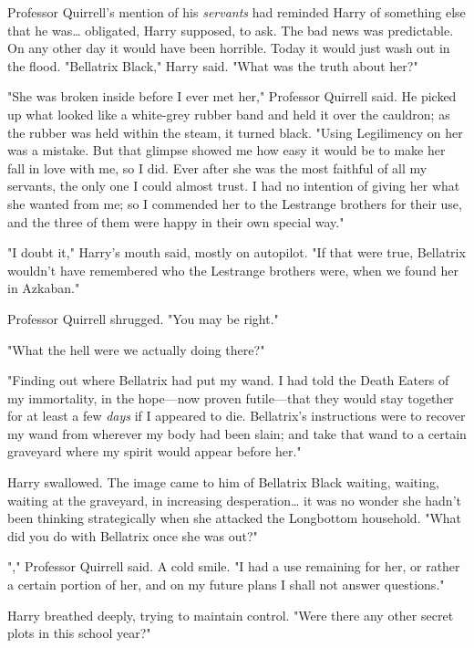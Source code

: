 Professor Quirrell's mention of his \emph{servants} had reminded Harry of 
something else that he was{\ldots} obligated, Harry supposed, to ask. The bad 
news was predictable. On any other day it would have been horrible. Today it 
would just wash out in the flood. "Bellatrix Black," Harry said. "What was the 
truth about her?"

"She was broken inside before I ever met her," Professor Quirrell said. He 
picked up what looked like a white-grey rubber band and held it over the 
cauldron; as the rubber was held within the steam, it turned black. "Using 
Legilimency on her was a mistake. But that glimpse showed me how easy it would 
be to make her fall in love with me, so I did. Ever after she was the most 
faithful of all my servants, the only one I could almost trust. I had no 
intention of giving her what she wanted from me; so I commended her to the 
Lestrange brothers for their use, and the three of them were happy in their own 
special way."

"I doubt it," Harry's mouth said, mostly on autopilot. "If that were true, 
Bellatrix wouldn't have remembered who the Lestrange brothers were, when we 
found her in Azkaban."

Professor Quirrell shrugged. "You may be right."

"What the hell were we actually doing there?"

"Finding out where Bellatrix had put my wand. I had told the Death Eaters of my 
immortality, in the hope---now proven futile---that they would stay together 
for at least a few \emph{days} if I appeared to die. Bellatrix's instructions 
were to recover my wand from wherever my body had been slain; and take that 
wand to a certain graveyard where my spirit would appear before her."

Harry swallowed. The image came to him of Bellatrix Black waiting, waiting, 
waiting at the graveyard, in increasing desperation{\ldots} it was no wonder 
she hadn't been thinking strategically when she attacked the Longbottom 
household. "What did you do with Bellatrix once she was out?"

"," Professor Quirrell 
said. A cold smile. "I had a use remaining for her, or rather a certain portion 
of her, and on my future plans I shall not answer questions."

Harry breathed deeply, trying to maintain control. "Were there any other secret 
plots in this school year?"

